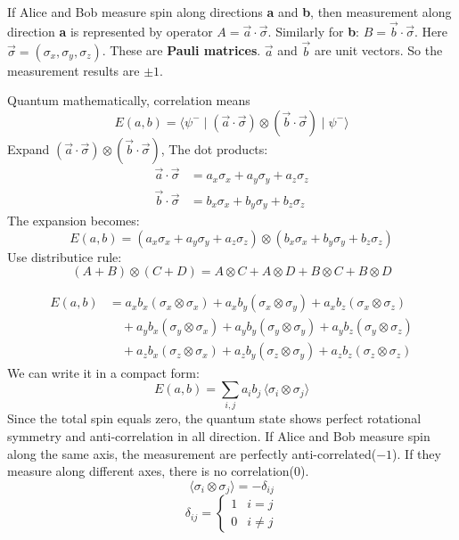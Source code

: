 \documentclass[14pt,a4paper]{extarticle}
\begin{document}
If Alice and Bob measure spin along directions \textbf{a} and \textbf{b}, then measurement along direction \textbf{a} is represented by operator $A = \vec{a} \cdot \vec{\sigma}$. Similarly for \textbf{b}: $B = \vec{b} \cdot \vec{\sigma}$. Here $\vec{\sigma} = (\sigma_x, \sigma_y, \sigma_z)$. These are \textbf{Pauli matrices}. $\vec{a}$ and $\vec{b}$ are unit vectors. So the measurement results are $\pm1$.

Quantum mathematically, correlation means
\setcounter{equation}{0}
\begin{equation}
E(a,b) = \langle \psi^- \mid (\vec{a} \cdot \vec{\sigma}) \otimes (\vec{b} \cdot \vec{\sigma}) \mid \psi^- \rangle
\end{equation}
Expand $(\vec{a} \cdot \vec{\sigma}) \otimes (\vec{b} \cdot \vec{\sigma})$,
The dot products:
\[
\begin{aligned}
\vec{a} \cdot \vec{\sigma} &= a_x \sigma_x + a_y \sigma_y + a_z \sigma_z \\
\vec{b} \cdot \vec{\sigma} &= b_x \sigma_x + b_y \sigma_y + b_z \sigma_z
\end{aligned}
\]
The expansion becomes:
\begin{equation}
E(a,b)=(a_x \sigma_x + a_y \sigma_y + a_z \sigma_z)
\otimes
(b_x \sigma_x + b_y \sigma_y + b_z \sigma_z)
\end{equation}
Use distributice rule:
\[
(A + B) \otimes (C + D) = A \otimes C + A \otimes D + B \otimes C + B \otimes D
\]

\begin{equation}
\begin{aligned}
E(a,b)&= a_x b_x (\sigma_x \otimes \sigma_x) + a_x b_y (\sigma_x \otimes \sigma_y) + a_x b_z (\sigma_x \otimes \sigma_z) \\
&\quad + a_y b_x (\sigma_y \otimes \sigma_x) + a_y b_y (\sigma_y \otimes \sigma_y) + a_y b_z (\sigma_y \otimes \sigma_z) \\
&\quad + a_z b_x (\sigma_z \otimes \sigma_x) + a_z b_y (\sigma_z \otimes \sigma_y) + a_z b_z (\sigma_z \otimes \sigma_z)
\end{aligned}
\end{equation}
We can write it in a compact form:
\begin{equation}
E(a,b) = \sum_{i,j} a_i b_j \, \langle \sigma_i \otimes \sigma_j \rangle
\end{equation}
Since the total spin equals zero, the quantum state shows perfect rotational symmetry and anti-correlation in all direction. If Alice and Bob measure spin along the same axis, the measurement are perfectly anti-correlated($-1$). If they measure along different axes, there is no correlation($0$).
\[
\langle \sigma_i \otimes \sigma_j \rangle = -\delta_{ij}
\]
\[
\delta_{ij} =
\begin{cases}
1 & i = j \\
0 & i \ne j
\end{cases}
\]
\end{document}

